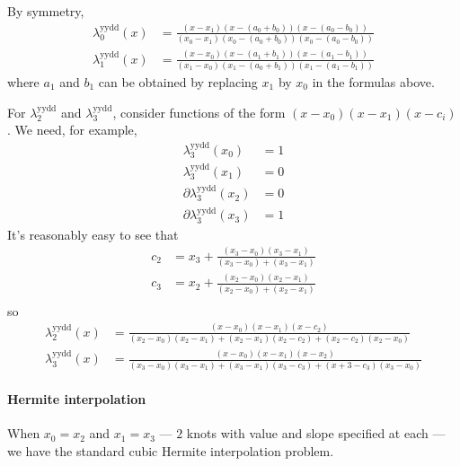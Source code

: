 By symmetry,  
\begin{align}
\lambda^{\text{yydd}}_0(x) & =
\frac{(x-x_1)(x-(a_0+b_0))(x-(a_0-b_0))}
{(x_0-x_1)(x_0-(a_0+b_0))(x_0-(a_0-b_0))}
\\
\lambda^{\text{yydd}}_1(x) & =
\frac{(x-x_0)(x-(a_1+b_1))(x-(a_1-b_1))}
{(x_1-x_0)(x_1-(a_0+b_1))(x_1-(a_1-b_1))}
\nonumber
\end{align}
where $a_1$ and $b_1$ can be obtained 
by replacing $x_1$ by $x_0$ in the formulas
above.

For $\lambda^{\text{yydd}}_2$ and $\lambda^{\text{yydd}}_3$, 
consider functions of the form $(x-x_0)(x-x_1)(x-c_i)$.
We need, for example, 
\begin{align}
\lambda^{\text{yydd}}_3(x_0) & = 1 \\ 
\lambda^{\text{yydd}}_3(x_1) & = 0 \nonumber \\
\partial\lambda^{\text{yydd}}_3(x_2) & = 0 \nonumber \\
\partial\lambda^{\text{yydd}}_3(x_3) & = 1 \nonumber 
\end{align}
It's reasonably easy to see that 
\begin{align}
c_2 & = x_3 + 
\frac{(x_3 - x_0)(x_3 - x_1)}{(x_3 - x_0) + (x_3 - x_1)} \\
c_3 & = x_2 + 
\frac{(x_2 - x_0)(x_2 - x_1)}{(x_2 - x_0) + (x_2 - x_1)} \\
\end{align}
so
\begin{align}
\lambda^{\text{yydd}}_2(x) & =
\frac{(x-x_0)(x-x_1)(x-c_2)}
{
(x_2-x_0)(x_2-x_1) +
(x_2-x_1)(x_2-c_2) +
(x_2-c_2)(x_2-x_0)}
\\
\lambda^{\text{yydd}}_3(x) & =
\frac{(x-x_0)(x-x_1)(x-x_2)}
{
(x_3-x_0)(x_3-x_1) +
(x_3-x_1)(x_3-c_3) +
(x+3-c_3)(x_3-x_0)}
\nonumber
\end{align}

\paragraph{Hermite interpolation}\label{sec:Hermite-yydd}

When $x_0 = x_2$ and $x_1 = x_3$ --- $2$ knots with value and 
slope specified at each --- 
we have the standard cubic Hermite interpolation
problem\cite{wiki:cubic-hermite-spline}.

